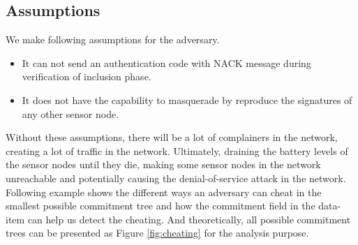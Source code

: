 
	\newpage
	\subsection{Assumptions}
	We make following assumptions for the adversary.
		\begin{itemize}
			\item It can not send an authentication code with NACK message during verification of inclusion phase.
			\item It does not have the capability to masquerade by reproduce the signatures of any other sensor node.
		\end{itemize}
	Without these assumptions, there will be a lot of complainers in the network, creating a lot of traffic in the network.
	Ultimately, draining the battery levels of the sensor nodes until they die, making some sensor nodes in the network unreachable and potentially causing the denial-of-service attack in the network.
	Following example shows the different ways an adversary can cheat in the smallest possible commitment tree and how the commitment field in the data-item can help us detect the cheating.
	And theoretically, all possible commitment trees can be presented as Figure \ref{fig:cheating} for the analysis purpose.
